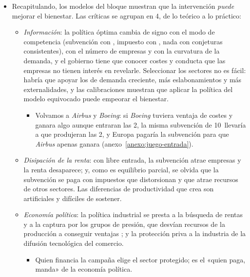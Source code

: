 \documentclass[11pt]{article}
\begin{document}
\begin{itemize}
\item Recapitulando, los modelos del bloque muestran que la intervención \emph{puede} mejorar el bienestar. Las críticas se agrupan en 4, de lo teórico a lo práctico:
  \begin{itemize}
  \item \emph{Información}: la política óptima cambia de signo con el modo de competencia (subvención con , impuesto con , nada con conjeturas consistentes), con el número de empresas y con la curvatura de la demanda, y el gobierno tiene que conocer costes y conducta que las empresas no tienen interés en revelarle\nocite{EatonGrossman1986Optimal,Dixit1984International,Brander1995Strategic}. Seleccionar los sectores no es fácil: habría que apoyar los de demanda creciente, más eslabonamientos y más externalidades, y las calibraciones muestran que aplicar la política del modelo equivocado puede empeorar el bienestar\nocite{KrishnaHoganSwagel1989Non}.
    \begin{itemize}
    \item Volvamos a \emph{Airbus} y \emph{Boeing}: si \emph{Boeing} tuviera ventaja de costes y ganara algo aunque entraran las 2, la misma subvención de 10~llevaría a que produjeran las 2, y Europa pagaría la subvención para que \emph{Airbus} apenas ganara (anexo~\ref{anexo:juego-entrada}).
    \end{itemize}
  \item \emph{Disipación de la renta}: con libre entrada, la subvención atrae empresas y la renta desaparece\nocite{HorstmannMarkusen1986Up}; y, como es equilibrio parcial, se olvida que la subvención se paga con impuestos que distorsionan y que atrae recursos de otros sectores. Las diferencias de productividad que crea son artificiales y difíciles de sostener.
  \item \emph{Economía política}: la política industrial se presta a la búsqueda de rentas y a la captura por los grupos de presión, que desvían recursos de la producción a conseguir ventajas ; y la protección priva a la industria de la difusión tecnológica del comercio.
    \begin{itemize}
    \item Quien financia la campaña elige el sector protegido; es el «quien paga, manda» de la economía política.
    \end{itemize}

\end{itemize}
\end{itemize}
\end{document}
